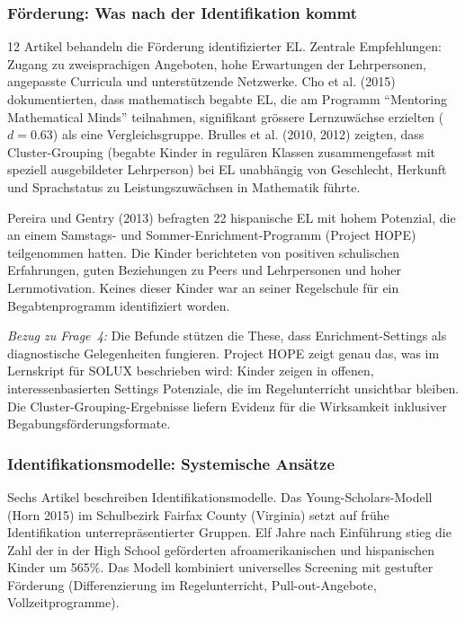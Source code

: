 \documentclass[ngerman, a4paper]{article}
\begin{document}
\subsubsection*{Förderung: Was nach der Identifikation kommt}

12 Artikel behandeln die Förderung identifizierter EL. Zentrale
Empfehlungen: Zugang zu zweisprachigen Angeboten, hohe Erwartungen der
Lehrpersonen, angepasste Curricula und unterstützende Netzwerke. Cho et al.
(2015) dokumentierten, dass mathematisch begabte EL, die am Programm
\enquote{Mentoring Mathematical Minds} teilnahmen, signifikant grössere
Lernzuwächse erzielten ($d = 0.63$) als eine Vergleichsgruppe. Brulles
et al. (2010, 2012) zeigten, dass Cluster-Grouping (begabte Kinder in
regulären Klassen zusammengefasst mit speziell ausgebildeter Lehrperson)
bei EL unabhängig von Geschlecht, Herkunft und Sprachstatus zu
Leistungszuwächsen in Mathematik führte.

Pereira und Gentry (2013) befragten 22 hispanische EL mit hohem
Potenzial, die an einem Samstags- und Sommer-Enrichment-Programm (Project
HOPE) teilgenommen hatten. Die Kinder berichteten von positiven
schulischen Erfahrungen, guten Beziehungen zu Peers und Lehrpersonen und
hoher Lernmotivation. Keines dieser Kinder war an seiner Regelschule für
ein Begabtenprogramm identifiziert worden.

\textit{Bezug zu Frage~4:} Die Befunde stützen die These, dass
Enrichment-Settings als diagnostische Gelegenheiten fungieren. Project
HOPE zeigt genau das, was im Lernskript für SOLUX beschrieben wird:
Kinder zeigen in offenen, interessenbasierten Settings Potenziale, die im
Regelunterricht unsichtbar bleiben. Die Cluster-Grouping-Ergebnisse
liefern Evidenz für die Wirksamkeit inklusiver
Begabungsförderungsformate.

\subsubsection*{Identifikationsmodelle: Systemische Ansätze}

Sechs Artikel beschreiben Identifikationsmodelle. Das
Young-Scholars-Modell (Horn 2015) im Schulbezirk Fairfax County
(Virginia) setzt auf frühe Identifikation unterrepräsentierter Gruppen.
Elf Jahre nach Einführung stieg die Zahl der in der High School
geförderten afroamerikanischen und hispanischen Kinder um 565\%. Das
Modell kombiniert universelles Screening mit gestufter Förderung
(Differenzierung im Regelunterricht, Pull-out-Angebote,
Vollzeitprogramme).
\end{document}
